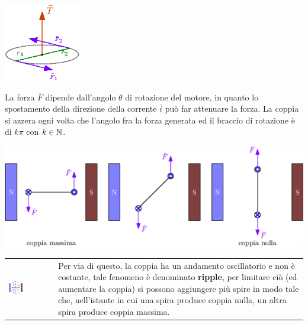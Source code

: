 \documentclass[10pt, letterpaper]{report}
\begin{document}
\begin{center}
    \includegraphics[width=0.25\textwidth ]{images/momento.eps}
\end{center}
La forza $\bar F$ dipende dall'angolo $\theta$ di rotazione del motore, in quanto lo spostamento della direzione della corrente $\bar i$ può far attenuare la forza. La coppia si azzera ogni volta che 
l'angolo fra la forza generata ed il braccio di rotazione è di $k\pi$ con $k\in{\mathbb N}$.
\begin{center}
    \includegraphics[width=1\textwidth ]{images/variazioneCoppia.eps}
\end{center}
\begin{center}
	\begin{tabular}{>{\centering\arraybackslash}m{3in}>{\arraybackslash}m{3in}}
        \includegraphics[width=0.33\textwidth ]{images/variazioneCoppia2.eps} & Per via di questo, la coppia ha un andamento oscillatorio e non è costante, tale fenomeno è denominato \textbf{ripple}, per limitare ciò (ed aumentare la coppia) si possono aggiungere più spire in modo tale che, nell'istante in cui una spira produce coppia nulla, un altra spira produce coppia massima.
		\\
	\end{tabular}
\end{center}
\end{document}
